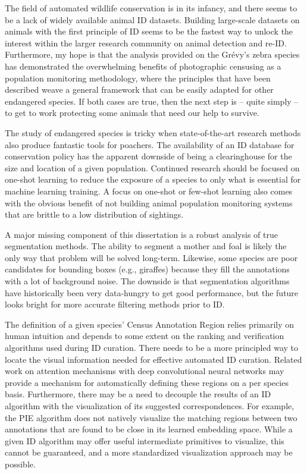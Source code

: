 The field of automated wildlife conservation is in its infancy, and there seems to be a lack of widely available animal ID datasets.  Building large-scale datasets on animals with the first principle of ID seems to be the fastest way to unlock the interest within the larger research community on animal detection and re-ID.  Furthermore, my hope is that the analysis provided on the Gr\'evy's zebra species has demonstrated the overwhelming benefits of photographic censusing as a population monitoring methodology, where the principles that have been described weave a general framework that can be easily adapted for other endangered species.  If both cases are true, then the next step is -- quite simply -- to get to work protecting some animals that need our help to survive.

The study of endangered species is tricky when state-of-the-art research methods also produce fantastic tools for poachers.  The availability of an ID database for conservation policy has the apparent downside of being a clearinghouse for the size and location of a given population.  Continued research should be focused on one-shot learning to reduce the exposure of a species to only what is essential for machine learning training.  A focus on one-shot or few-shot learning also comes with the obvious benefit of not building animal population monitoring systems that are brittle to a low distribution of sightings.

A major missing component of this dissertation is a robust analysis of true segmentation methods.  The ability to segment a mother and foal is likely the only way that problem will be solved long-term.  Likewise, some species are poor candidates for bounding boxes (e.g., giraffes) because they fill the annotations with a lot of background noise.  The downside is that segmentation algorithms have historically been very data-hungry to get good performance, but the future looks bright for more accurate filtering methods prior to ID.

The definition of a given species’ Census Annotation Region relies primarily on human intuition and depends to some extent on the ranking and verification algorithms used during ID curation. There needs to be a more principled way to locate the visual information needed for effective automated ID curation. Related work on attention mechanisms with deep convolutional neural networks may provide a mechanism for automatically defining these regions on a per species basis. Furthermore, there may be a need to decouple the results of an ID algorithm with the visualization of its suggested correspondences. For example, the PIE algorithm does not natively visualize the matching regions between two annotations that are found to be close in its learned embedding space. While a given ID algorithm may offer useful intermediate primitives to visualize, this cannot be guaranteed, and a more standardized visualization approach may be possible.

